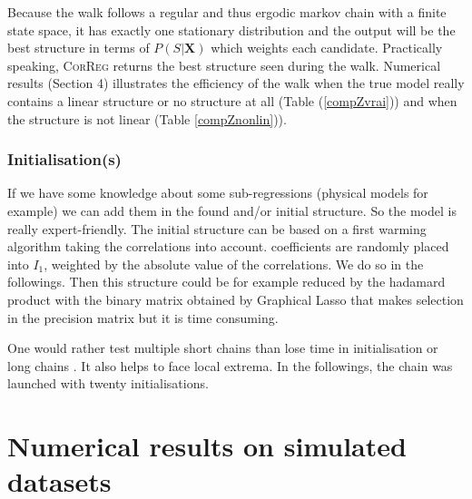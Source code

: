 \documentclass[11pt,a4paper]{article}
\begin{document}
Because the walk follows a regular and thus ergodic markov chain with a finite state space, it has exactly one stationary distribution \cite{grinstead1997introduction} %
%	
%	
%		
and the output will be the best structure in terms of $P(S|\boldsymbol{X})$ which weights each candidate. Practically speaking, \textsc{CorReg} returns the best structure seen during the walk.
Numerical results (Section 4) illustrates the efficiency of the walk when the true model really contains a linear structure or no structure at all (Table (\ref{compZvrai})) and when the structure is not linear (Table \ref{compZnonlin})).

 \subsubsection{Initialisation(s)}
 If we have some knowledge about some sub-regressions (physical models for example) we can add them in the found and/or initial structure. So the model is really expert-friendly.
The initial structure can be based on a first warming algorithm taking the correlations into account. coefficients are randomly placed into $I_1$, weighted by the absolute value of the correlations. We do so in the followings. Then this structure could be for example reduced by the hadamard product with the binary matrix obtained by Graphical Lasso\cite{friedman2008sparse} that makes selection in the precision matrix but it is time consuming.

	One would rather test multiple short chains than lose time in initialisation or long chains \cite{gilks1996markov}. It also helps to face local extrema. In the followings, the chain was launched with twenty initialisations.
	
\section{Numerical results on simulated datasets} \label{sectionsimul}
\end{document}
